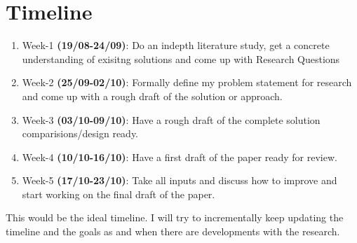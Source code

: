 \documentclass[11pt,letterpaper]{article}
\begin{document}
\section*{Timeline}
\begin{enumerate}
  \item Week-1 \textbf{(19/08-24/09)}: Do an indepth literature study, get a concrete understanding of exisitng solutions and come up with Research Questions  
  \item Week-2 \textbf{(25/09-02/10)}: Formally define my problem statement for research and come up with a rough draft of the solution or approach.
  \item Week-3 \textbf{(03/10-09/10)}: Have a rough draft of the complete solution comparisions/design ready.
  \item Week-4 \textbf{(10/10-16/10)}: Have a first draft of the paper ready for review.
  \item Week-5 \textbf{(17/10-23/10)}: Take all inputs and discuss how to improve and start working on the final draft of the paper.
\end{enumerate}
This would be the ideal timeline. I will try to incrementally keep updating the timeline and the goals as and when there are developments with the research.



\end{document}
